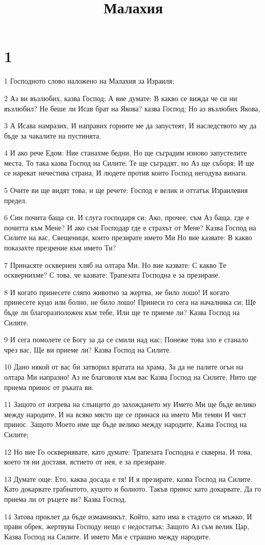 

\title{Малахия}


\chapter{1}

\par 1 Господното слово наложено на Малахия за Израиля;
\par 2 Аз ви възлюбих, казва Господ; А вие думате: В какво се вижда че си ни възлюбил? Не беше ли Исав брат на Якова? казва Господ; Но аз възлюбих Якова,
\par 3 А Исава намразих, И направих горните ме да запустеят, И наследството му да бъде за чакалите на пустинята.
\par 4 И ако рече Едом: Ние станахме бедни, Но ще съградим изново запустелите места, То така казва Господ на Силите: Те ще съградят, но Аз ще съборя; И ще се нарекат нечестива страна, И людете против които Господ негодува винаги.
\par 5 Очите ви ще видят това, и ще речете: Господ е велик и оттатък Израилевия предел.
\par 6 Син почита баща си. И слуга господаря си; Ако, прочее, съм Аз баща, где е почитта към Мене? И ако съм Господар где е страхът от Мене? Казва Господ на Силите на вас, Свещеници, които презирате името Ми Но вие казвате: В какво показахте презрение към името Ти?
\par 7 Принасяте осквернен хляб на олтара Ми. Но вие казвате: С какво Те осквернихме? С това, че казвате: Трапезата Господна е за презиране.
\par 8 И когато принесете сляпо животно за жертва, не било лошо! И когато принесете куцо или болно, не било лошо! Принеси го сега на началника си; Ще бъде ли благоразположен към тебе, Или ще те приеме ли? Казва Господ на Силите.
\par 9 И сега помолете се Богу за да се смили над нас; Понеже това зло е станало чрез вас, Ще ви приеме ли? Казва Господ на Силите.
\par 10 Дано някой от вас би затворил вратата на храма, За да не палите огън на олтара Ми напразно! Аз не благоволя към вас Казва Господ на Силите, Нито ще приема принос от ръката ви.
\par 11 Защото от изгрева на слънцето до захождането му Името Ми ще бъде велико между народите, И на всяко място ще се принася на името Ми темян И чист принос. Защото Моето име ще бъде велико между народите, Казва Господ на Силите;
\par 12 Но вие Го осквернявате, като думате: Трапезата Господна е скверна, И това, което тя ни доставя, ястието от нея, е за презиране.
\par 13 Думате още: Ето, каква досада е тя! И я презирате, казва Господ на Силите. Като докарвате грабнатото, куцото и болното. Такъв принос като докарвате, Да го приема ли от ръцете ви? Казва Господ.
\par 14 Затова проклет да бъде измамникът, Който, като има в стадото си мъжко, И прави обрек, жертвува Господу нещо с недостатък; Защото Аз съм велик Цар, Казва Господ на Силите. И името Ми е страшно между народите.

